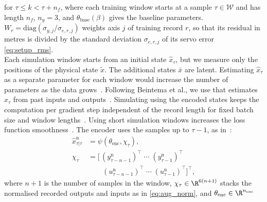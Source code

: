 for $\tau\le k<\tau+n_f$, where each training window starts at a sample
$\tau\in\mathcal W$ and has length $n_f$, $n_y=3$, and
$\theta_{\mathrm{base}}(\beta)$ gives the baseline parameters.
$W_r=\mathrm{diag}(\sigma_{y,j}/\sigma_{e,r,j})$ weights axis $j$ of training
record $r$, so that its residual in metres is divided by the standard
deviation $\sigma_{e,r,j}$ of its servo error \eqref{eq:setup_rms}.
\\
Each simulation window starts from an initial state $\hat x_\tau$, but we 
measure only the positions of the physical state $\tilde x$.
The additional states $\bar x$ are latent.
Estimating $\hat x_\tau$ as a separate parameter for each window
would increase the number of parameters as the data
grows~\cite[Sec.~3.1]{beintema2023subnet}.
Following Beintema et al., we use  that estimates $\hat x_\tau$ from
past inputs and outputs~\cite[Sec.~3.2]{beintema2023subnet}.
Simulating  using the encoded states
keeps the computation per gradient step independent of the record length
for fixed batch size and window lengths~\cite[Sec.~3.1, Eq.~(9)]{beintema2023subnet}.
Using short simulation windows increases the loss function
smoothness~\cite[Sec.~3.1]{beintema2023subnet}.
The encoder uses the samples up to $\tau-1$,
as in~\cite[Eq.~(22e)]{hoekstra2026lfr}:
\begin{equation}
\begin{aligned}
 \hat x^{\mathrm n}_{\tau|\tau}
 &=\psi(\theta_{\mathrm{enc}},\chi_\tau),\\
 \chi_\tau&=\bigl[\,(y^{\mathrm n}_{\tau-n-1})^\top\;\cdots\;(y^{\mathrm n}_{\tau-1})^\top\\
 &\qquad(u^{\mathrm n}_{\tau-n-1})^\top\;\cdots\;(u^{\mathrm n}_{\tau-1})^\top\bigr]^\top,
\end{aligned}
 \label{eq:aug_encoder}
\end{equation}
where $n+1$ is the number of samples in the window,
$\chi_\tau\in\R^{6(n+1)}$ stacks the normalised recorded
outputs and inputs as in \eqref{eq:aug_norm}, and $\theta_{\mathrm{enc}}\in\R^{n_{\mathrm{enc}}}$
